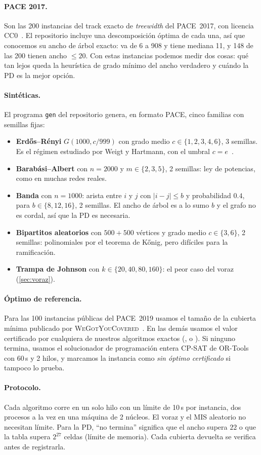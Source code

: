\paragraph{PACE 2017.} Son las 200 instancias del track exacto de \emph{treewidth} del PACE~2017, con licencia CC0~\citep{pace2017data}. El repositorio incluye una descomposición óptima de cada una, así que conocemos su ancho de árbol exacto: va de 6 a 908 y tiene mediana 11, y 148 de las 200 tienen ancho $\le 20$. Con estas instancias podemos medir dos cosas: qué tan lejos queda la heurística de grado mínimo del ancho verdadero y cuándo la PD es la mejor opción.

\paragraph{Sintéticas.} El programa \texttt{gen} del repositorio genera, en formato PACE, cinco familias con semillas fijas:
\begin{itemize}
  \item \textbf{Erdős--Rényi} $G(1000,c/999)$ con grado medio $c\in\{1,2,3,4,6\}$, 3 semillas. Es el régimen estudiado por Weigt y Hartmann, con el umbral $c=e$~\citep{weigt2000}.
  \item \textbf{Barabási--Albert} con $n=2000$ y $m\in\{2,3,5\}$, 2 semillas: ley de potencias, como en muchas redes reales.
  \item \textbf{Banda} con $n=1000$: arista entre $i$ y $j$ con $|i-j|\le b$ y probabilidad $0.4$, para $b\in\{8,12,16\}$, 2 semillas. El ancho de árbol es a lo sumo $b$ y el grafo no es cordal, así que la PD es necesaria.
  \item \textbf{Bipartitos aleatorios} con $500+500$ vértices y grado medio $c\in\{3,6\}$, 2 semillas: polinomiales por el teorema de Kőnig, pero difíciles para la ramificación.
  \item \textbf{Trampa de Johnson} con $k\in\{20,40,80,160\}$: el peor caso del voraz (\cref{sec:voraz}).
\end{itemize}

\paragraph{Óptimo de referencia.} Para las 100 instancias públicas del PACE~2019 usamos el tamaño de la cubierta mínima publicado por \textsc{WeGotYouCovered}~\citep{hespe2020}. En las demás usamos el valor certificado por cualquiera de nuestros algoritmos exactos (,  o \hyvc). Si ninguno termina, usamos el solucionador de programación entera CP-SAT de OR-Tools con 60\,s y 2 hilos, y marcamos la instancia como \emph{sin óptimo certificado} si tampoco lo prueba.

\paragraph{Protocolo.} Cada algoritmo corre en un solo hilo con un límite de 10\,s por instancia, dos procesos a la vez en una máquina de 2 núcleos. El voraz y el MIS aleatorio no necesitan límite. Para la PD, ``no termina'' significa que el ancho supera $22$ o que la tabla supera $2^{27}$ celdas (límite de memoria). Cada cubierta devuelta se verifica antes de registrarla.
